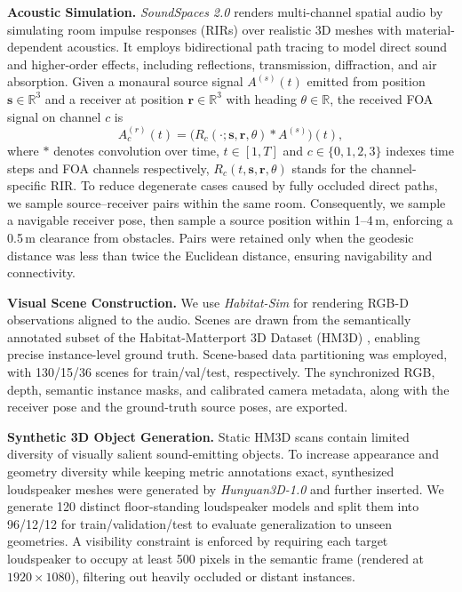 \textbf{Acoustic Simulation.} \textit{SoundSpaces 2.0} renders multi-channel spatial audio by simulating room impulse responses (RIRs) over realistic 3D meshes with material-dependent acoustics. 
It employs bidirectional path tracing \citep{cao2016interactive} to model direct sound and higher-order effects, including reflections, transmission, diffraction, and air absorption. 
Given a monaural source signal $A^{(s)}(t)$ emitted from position $\mathbf{s}\in\mathbb{R}^3$ and a receiver at position $\mathbf{r}\in\mathbb{R}^3$ with heading $\theta\in\mathbb{R}$, the received FOA signal on channel $c$ is
\begin{equation}
    A^{(r)}_c(t) = \bigl(R_c(\cdot;\mathbf{s},\mathbf{r},\theta)\ast A^{(s)}\bigr)(t),
\end{equation}
where $\ast$ denotes convolution over time, $t \in [1, T]$ and $c \in \{0, 1, 2, 3\}$ indexes time steps and FOA channels respectively, $R_c(t, \mathbf{s}, \mathbf{r}, \theta)$ stands for the channel-specific RIR.
To reduce degenerate cases caused by fully occluded direct paths, we sample source--receiver pairs within the same room. 
Consequently, we sample a navigable receiver pose, then sample a source position within 1--4\,m, enforcing a 0.5\,m clearance from obstacles. 
Pairs were retained only when the geodesic distance was less than twice the Euclidean distance, ensuring navigability and connectivity.

\textbf{Visual Scene Construction.} We use \textit{Habitat-Sim} \citep{szot2021habitat} for rendering RGB-D observations aligned to the audio. Scenes are drawn from the semantically annotated subset of the Habitat-Matterport 3D Dataset (HM3D) \citep{ramakrishnan2021habitat}, enabling precise instance-level ground truth. Scene-based data partitioning was employed, with 130/15/36 scenes for train/val/test, respectively. The synchronized RGB, depth, semantic instance masks, and calibrated camera metadata, along with the receiver pose and the ground-truth source poses, are exported.

\textbf{Synthetic 3D Object Generation.} 
Static HM3D scans contain limited diversity of visually salient sound-emitting objects. 
To increase appearance and geometry diversity while keeping metric annotations exact, synthesized loudspeaker meshes were generated by \textit{Hunyuan3D-1.0} \cite{yang2024hunyuan3d} and further inserted. 
We generate 120 distinct floor-standing loudspeaker models and split them into 96/12/12 for train/validation/test to evaluate generalization to unseen geometries. 
A visibility constraint is enforced by requiring each target loudspeaker to occupy at least 500 pixels in the semantic frame (rendered at $1920 \times 1080$), filtering out heavily occluded or distant instances.

